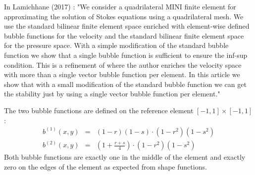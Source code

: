 In Lamichhane (2017) \cite{lami17}: "We consider a quadrilateral MINI
finite element for approximating the solution
of Stokes equations using a quadrilateral mesh. We use the standard bilinear finite
element space enriched with element-wise defined bubble functions for the velocity
and the standard bilinear finite element space for the pressure space. With a simple
modification of the standard bubble function we show that a single bubble function is
sufficient to ensure the inf-sup condition.
This is a refinement of \cite{bai97} where the author enriches the velocity space with
more than a single vector bubble function per element. In this article we show that with a small modification of the standard bubble function we can get the stability just by using a single vector bubble function per element."

The two bubble functions are defined on the reference element $[-1,1]\times [-1,1]$:
\begin{eqnarray}
b^{(1)}(x,y) &=&  (1-r)(1-s)\cdot (1-r^2) (1-s^2) \\  
b^{(2)}(x,y) &=&  \left(1+\frac{r+s}{4}\right) \cdot (1-r^2) (1-s^2) 
\end{eqnarray}
Both bubble functions are exactly one in the middle of the element and exactly zero on the edges
of the element as expected from shape functions.




